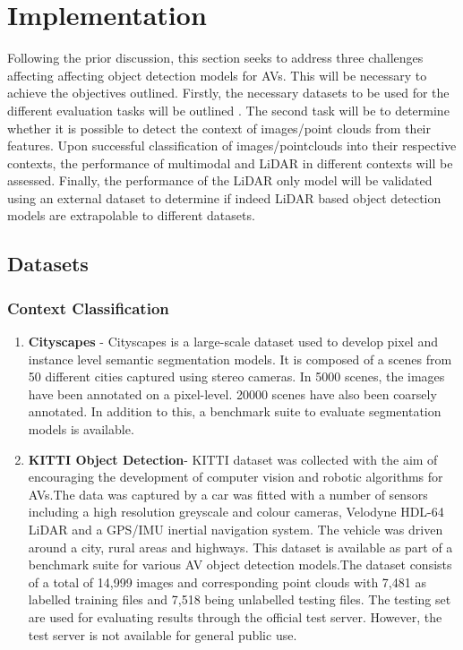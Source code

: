 \let\textcircled=\pgftextcircled


\chapter{Implementation}
\label{chap:implementation}

Following the prior discussion, this section seeks to address three challenges affecting affecting object detection models for AVs. This will be necessary to achieve the objectives outlined. Firstly, the necessary datasets to be used for the different evaluation tasks will be outlined . The second task will be to determine whether it is possible to detect the context of  images/point clouds from their features. Upon successful classification of images/pointclouds into their respective contexts, the performance of multimodal and LiDAR in different contexts will be assessed.  Finally, the performance of the LiDAR only model will be validated using an external dataset to determine if indeed LiDAR based object detection models are extrapolable to different datasets. 
\section{Datasets}
\subsection{Context Classification}
\begin{enumerate}
	\item \textbf{Cityscapes} - Cityscapes is a large-scale dataset used to develop pixel and instance level semantic segmentation models. It is composed of a scenes from 50 different cities captured using stereo cameras. In 5000 scenes, the images have been annotated on a pixel-level. 20000 scenes have also been coarsely annotated. In addition to this, a benchmark suite to evaluate segmentation models is available.  
	
	\item \textbf{KITTI Object Detection}- KITTI dataset was collected with the aim of encouraging the development of computer vision and robotic algorithms for AVs.The data was captured by a car was fitted with a number of sensors including a high resolution greyscale and colour cameras, Velodyne HDL-64 LiDAR and a GPS/IMU inertial navigation system. The vehicle was driven around a city, rural areas and highways. This dataset is available as part of a benchmark suite for various AV object detection models.The dataset consists of  a total of 14,999 images and corresponding point clouds with  7,481 as labelled training files and 7,518 being unlabelled testing files. The testing set are used for evaluating results through the official test server. However, the test server is not available for general public use. 
\end{enumerate}

